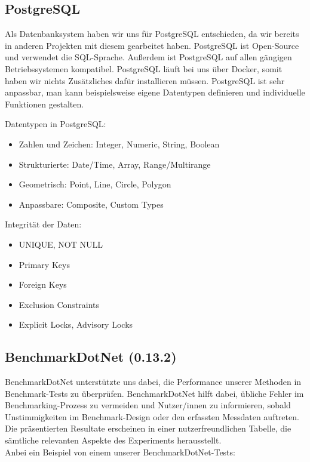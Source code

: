 \subsection*{PostgreSQL}

Als Datenbanksystem haben wir uns für PostgreSQL entschieden, da wir bereits in anderen 
Projekten mit diesem gearbeitet haben. PostgreSQL ist Open-Source und verwendet die SQL-Sprache. 
Außerdem ist PostgreSQL auf allen gängigen Betriebssystemen kompatibel.
PostgreSQL läuft bei uns über Docker, somit haben wir nichts Zusätzliches dafür installieren müssen.
PostgreSQL ist sehr anpassbar, man kann beispielsweise eigene Datentypen 
definieren und individuelle Funktionen gestalten.\\ \cite{postgres}

Datentypen in PostgreSQL:
\begin{itemize}
    \item Zahlen und Zeichen: Integer, Numeric, String, Boolean
    \item Strukturierte: Date/Time, Array, Range/Multirange
    \item Geometrisch: Point, Line, Circle, Polygon
    \item Anpassbare: Composite, Custom Types
\end{itemize}

Integrität der Daten:
\begin{itemize}
    \item UNIQUE, NOT NULL
    \item Primary Keys
    \item Foreign Keys
    \item Exclusion Constraints
    \item Explicit Locks, Advisory Locks
\end{itemize}
\cite{postgres}

\newpage
\subsection*{BenchmarkDotNet (0.13.2)}

BenchmarkDotNet unterstützte uns dabei, die Performance unserer Methoden in 
Benchmark-Tests zu überprüfen. BenchmarkDotNet hilft dabei, übliche Fehler im Benchmarking-Prozess 
zu vermeiden und Nutzer/innen zu informieren, sobald Unstimmigkeiten im Benchmark-Design oder den 
erfassten Messdaten auftreten. Die präsentierten Resultate erscheinen in einer 
nutzerfreundlichen Tabelle, die sämtliche relevanten Aspekte des Experiments herausstellt.\\
Anbei ein Beispiel von einem unserer BenchmarkDotNet-Tests: \cite{benchmark}\\

